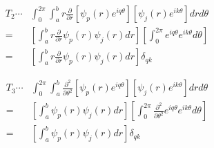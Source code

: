 \documentclass[11pt,letterpaper]{article}
\begin{document}
\begin{align*}
T_2\cdots & \int_{0}^{2\pi}\int_{a}^{b} r\frac{\partial}{\partial
r}\left[ \psi_p(r) e^{iq\theta}\right]
\left[ \psi_j(r)e^{ik\theta}\right] dr d\theta\\
=& \left[ \int_{a}^{b} r\frac{\partial}{\partial r}\psi_p(r)
\psi_j(r) dr \right] \left[ \int_{0}^{2\pi} e^{iq\theta}  e^{ik\theta}  d\theta \right] \\
=& \left[ \int_{a}^{b} r\frac{\partial}{\partial r}\psi_p(r)
\psi_j(r) dr \right] \delta_{qk}
\end{align*}

\begin{align*}
T_3\cdots & \int_{0}^{2\pi}\int_{a}^{b} \frac{\partial^2}{\partial
\theta^2} \left[ \psi_p(r) e^{iq\theta}\right] \left[
\psi_j(r)e^{ik\theta}\right] dr d\theta \\
=& \left[ \int_{a}^{b} \psi_p(r) \psi_j(r) dr \right] \left[
\int_{0}^{2\pi} \frac{\partial^2}{\partial \theta^2} e^{iq\theta}
e^{ik\theta} d\theta \right] \\
=& \left[ \int_{a}^{b} \psi_p(r) \psi_j(r) dr \right] \delta_{qk} \\
\end{align*}
\end{document}
